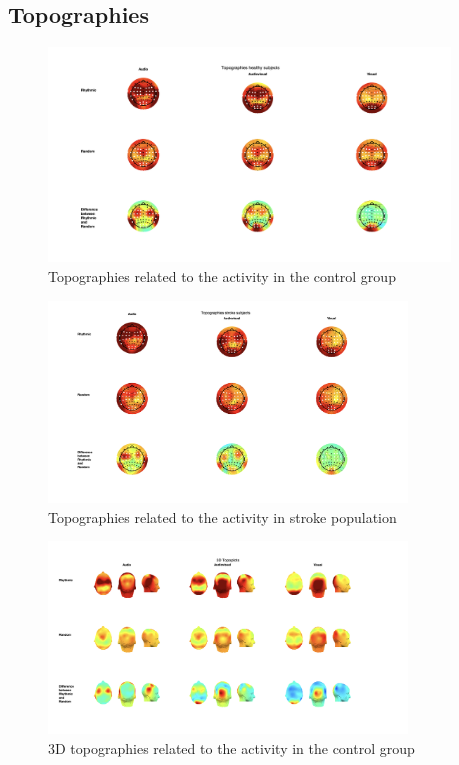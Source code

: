 \clearpage
\subsection*{Topographies}
\begin{figure}[htbp]
    \centering
    \includegraphics[width=0.95\textwidth]{healthy_images/topo.png}
    \caption{Topographies related to the activity in the control group}
    \label{fig: topographies control group}
\end{figure}
\begin{figure}[htbp]
    \centering
    \includegraphics[width=0.85\textwidth]{stroke_images/topographies.png}
    \caption{Topographies related to the activity in stroke population}
    \label{fig: topographies stroke group}
\end{figure}
\begin{figure}[htbp]
    \centering
    \includegraphics[width=0.85\textwidth]{healthy_images/3d_topo.png}
    \caption{3D topographies related to the activity in the control group}
    \label{fig: 3D topographies control group}   
\end{figure} 
